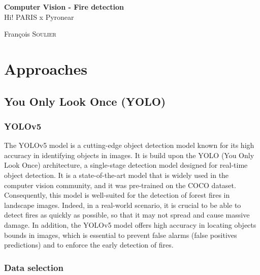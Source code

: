 \documentclass{article}
\begin{document}
\begin{titlepage}
\begin{center}


{ {\huge \bfseries Computer Vision - Fire detection}\\[0.4cm]
    \LARGE Hi! PARIS x Pyronear}

\vfill

\begin{minipage}{0.5\textwidth}
    \large
    \centering
    François \textsc{Soulier}
\end{minipage}

\end{center}
\end{titlepage}

\tableofcontents
\thispagestyle{empty}
\newpage
\setcounter{page}{1}

\section{Approaches}

\subsection{You Only Look Once (YOLO)}

\subsubsection{YOLOv5}

The YOLOv5 model is a cutting-edge object detection model known for its high accuracy in identifying objects in images. It is build upon the YOLO (You Only Look Once) architecture, a single-stage detection model designed for real-time object detection. It is a state-of-the-art model that is widely used in the computer vision community, and it was pre-trained on the COCO dataset.\\

Consequently, this model is well-suited for the detection of forest fires in landscape images. Indeed, in a real-world scenario, it is crucial to be able to detect fires as quickly as possible, so that it may not spread and cause massive damage.
In addition, the YOLOv5 model offers high accuracy in locating objects bounds in images, which is essential to prevent false alarms (false positives predictions) and to enforce the early detection of fires.

\subsubsection{Data selection}
\end{document}
